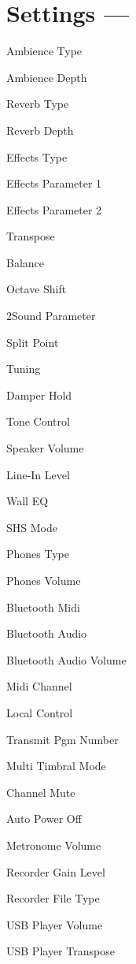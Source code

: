 \section[Settings]{Settings --- \UiKey{\SET}}

Ambience Type


Ambience Depth

Reverb Type


Reverb Depth

Effects Type

Effects Parameter 1


Effects Parameter 2

Transpose


Balance

Octave Shift

2Sound Parameter


Split Point




Tuning

Damper Hold

Tone Control


Speaker Volume

Line-In Level


Wall EQ

SHS Mode

Phones Type


Phones Volume

Bluetooth Midi


Bluetooth Audio

Bluetooth Audio Volume

Midi Channel


Local Control

Transmit Pgm Number


Multi Timbral Mode

Channel Mute

Auto Power Off


Metronome Volume

Recorder Gain Level


Recorder File Type

USB Player Volume

USB Player Transpose
